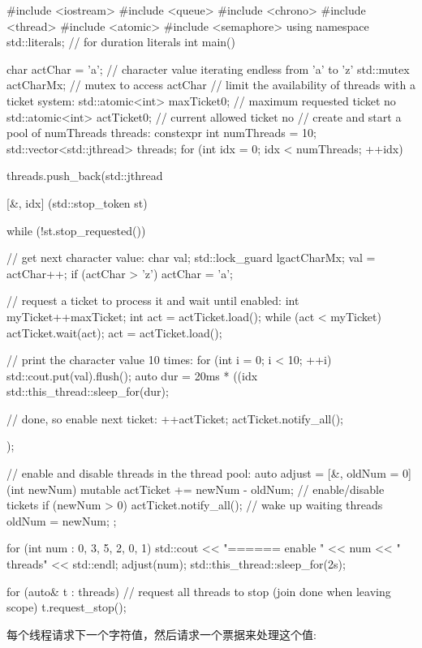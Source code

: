 \begin{cpp}
#include <iostream>
#include <queue>
#include <chrono>
#include <thread>
#include <atomic>
#include <semaphore>
using namespace std::literals; // for duration literals
int main()
{
	char actChar = 'a'; // character value iterating endless from ’a’ to ’z’
	std::mutex actCharMx; // mutex to access actChar
	// limit the availability of threads with a ticket system:
	std::atomic<int> maxTicket{0}; // maximum requested ticket no
	std::atomic<int> actTicket{0}; // current allowed ticket no
	// create and start a pool of numThreads threads:
	constexpr int numThreads = 10;
	std::vector<std::jthread> threads;
	for (int idx = 0; idx < numThreads; ++idx) {
		threads.push_back(std::jthread{[&, idx] (std::stop_token st) {
										while (!st.stop_requested()) {
											// get next character value:
											char val;
											{
												std::lock_guard lg{actCharMx};
												val = actChar++;
												if (actChar > 'z') actChar = 'a';
												}
												
												// request a ticket to process it and wait until enabled:
												int myTicket{++maxTicket};
												int act = actTicket.load();
												while (act < myTicket) {
												actTicket.wait(act);
												act = actTicket.load();
												}
												
												// print the character value 10 times:
												for (int i = 0; i < 10; ++i) {
												std::cout.put(val).flush();
												auto dur = 20ms * ((idx %
												std::this_thread::sleep_for(dur);
												}
												
												// done, so enable next ticket:
												++actTicket;
												actTicket.notify_all();
											}
										}});
	}
	
	// enable and disable threads in the thread pool:
	auto adjust = [&, oldNum = 0] (int newNum) mutable {
					actTicket += newNum - oldNum; // enable/disable tickets
					if (newNum > 0) actTicket.notify_all(); // wake up waiting threads
					oldNum = newNum;
					};
					
	for (int num : {0, 3, 5, 2, 0, 1}) {
		std::cout << "\n====== enable " << num << " threads" << std::endl;
		adjust(num);
		std::this_thread::sleep_for(2s);
	}
	
	for (auto& t : threads) { // request all threads to stop (join done when leaving scope)
		t.request_stop();
	}
}
\end{cpp}

每个线程请求下一个字符值，然后请求一个票据来处理这个值:

